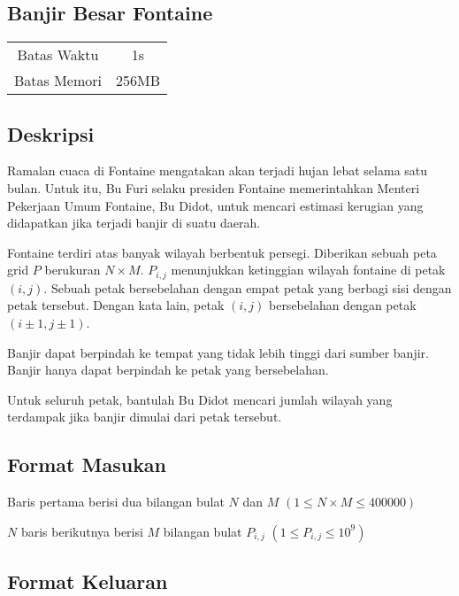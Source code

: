 \documentclass{article}
\begin{document}
\begin{center}

    
    \section*{Banjir Besar Fontaine} %

    \begin{tabular}{ | c c | }
        \hline
        Batas Waktu  & 1s \\    %
        Batas Memori & 256MB \\  %
        \hline
    \end{tabular}
\end{center}

\subsection*{Deskripsi}

Ramalan cuaca di Fontaine mengatakan akan terjadi hujan lebat selama satu bulan. Untuk itu, Bu Furi selaku presiden Fontaine memerintahkan Menteri Pekerjaan Umum Fontaine, Bu Didot, untuk mencari estimasi kerugian yang didapatkan jika terjadi banjir di suatu daerah.

Fontaine terdiri atas banyak wilayah berbentuk persegi. Diberikan sebuah peta grid $P$ berukuran $N \times M$. $P_{i,j}$ menunjukkan ketinggian wilayah fontaine di petak $(i, j)$. Sebuah petak bersebelahan dengan empat petak yang berbagi sisi dengan petak tersebut. Dengan kata lain, petak $(i, j)$ bersebelahan dengan petak $(i \pm 1, j \pm 1)$.

Banjir dapat berpindah ke tempat yang tidak lebih tinggi dari sumber banjir. Banjir hanya dapat berpindah ke petak yang bersebelahan.

Untuk seluruh petak, bantulah Bu Didot mencari jumlah wilayah yang terdampak jika banjir dimulai dari petak tersebut.

\subsection*{Format Masukan}

Baris pertama berisi dua bilangan bulat $N$ dan $M$ $(1 \leq N \times M \leq 400000)$

$N$ baris berikutnya berisi $M$ bilangan bulat $P_{i,j}$ $(1 \leq P_{i,j} \leq 10^9)$

\subsection*{Format Keluaran}
\end{document}
